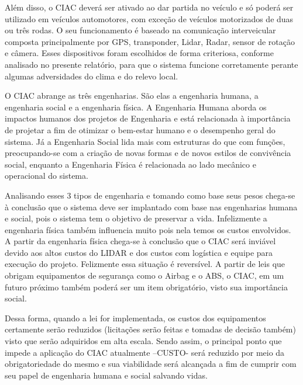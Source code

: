 Além disso, o CIAC deverá ser ativado ao dar partida no veículo e só poderá ser utilizado em veículos automotores, com exceção de veículos motorizados de duas ou três rodas. O seu funcionamento é baseado na comunicação interveicular composta principalmente por GPS, transponder, Lidar, Radar, sensor de rotação e câmera. Esses dispositivos foram escolhidos de forma criteriosa, conforme analisado no presente relatório, para que o sistema funcione corretamente perante algumas adversidades do clima e do relevo local.

O CIAC abrange as três engenharias. São elas a engenharia humana, a engenharia social e a engenharia física. A Engenharia Humana aborda os impactos humanos dos projetos de Engenharia e está relacionada à importância de projetar a fim de otimizar o bem-estar humano e o desempenho geral do sistema. Já a Engenharia Social lida mais com estruturas do que com funções, preocupando-se com a criação de novas formas e de novos estilos de convivência social, enquanto a Engenharia Física é relacionada ao lado mecânico e operacional do sistema.

Analisando esses 3 tipos de engenharia e tomando como base seus pesos chega-se à conclusão que o sistema deve ser implantado com base nas engenharias humana e social, pois o sistema tem o objetivo de preservar a vida. Infelizmente a engenharia física também influencia muito pois nela temos os custos envolvidos. A partir da engenharia física chega-se à conclusão que o CIAC será inviável devido aos altos custos do LIDAR e dos custos com logística e equipe para execução do projeto. Felizmente essa situação é reversível. A partir de leis que obrigam equipamentos de segurança como o Airbag e o ABS, o CIAC, em um futuro próximo também poderá ser um item obrigatório, visto sua importância social.

Dessa forma, quando a lei for implementada, os custos dos equipamentos certamente serão reduzidos (licitações serão feitas e tomadas de decisão também) visto que serão adquiridos em alta escala. Sendo assim, o principal ponto que impede a aplicação do CIAC atualmente –CUSTO- será reduzido por meio da obrigatoriedade do mesmo e sua viabilidade será alcançada a fim de cumprir com seu papel de engenharia humana e social salvando vidas.
